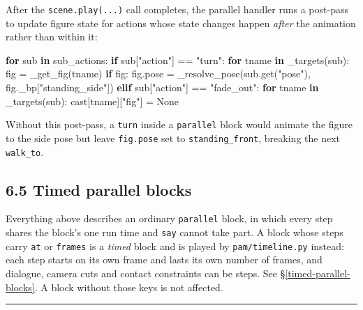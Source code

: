 \documentclass[
  12pt,
  letterpaper,
]{book}
\newenvironment{Shaded}{}{}
\newcommand{\ControlFlowTok}[1]{\textcolor[rgb]{0.00,0.44,0.13}{\textbf{#1}}}
\newcommand{\KeywordTok}[1]{\textcolor[rgb]{0.00,0.44,0.13}{\textbf{#1}}}
\newcommand{\NormalTok}[1]{#1}
\newcommand{\OperatorTok}[1]{\textcolor[rgb]{0.40,0.40,0.40}{#1}}
\newcommand{\StringTok}[1]{\textcolor[rgb]{0.25,0.44,0.63}{#1}}
\newcommand{\VariableTok}[1]{\textcolor[rgb]{0.10,0.09,0.49}{#1}}
\begin{document}
After the \texttt{scene.play(...)} call completes, the parallel handler
runs a post-pass to update figure state for actions whose state changes
happen \emph{after} the animation rather than within it:

\begin{Shaded}
\begin{Highlighting}[]
\ControlFlowTok{for}\NormalTok{ sub }\KeywordTok{in}\NormalTok{ sub\_actions:}
    \ControlFlowTok{if}\NormalTok{ sub[}\StringTok{"action"}\NormalTok{] }\OperatorTok{==} \StringTok{"turn"}\NormalTok{:}
        \ControlFlowTok{for}\NormalTok{ tname }\KeywordTok{in}\NormalTok{ \_targets(sub):}
\NormalTok{            fig }\OperatorTok{=}\NormalTok{ \_get\_fig(tname)}
            \ControlFlowTok{if}\NormalTok{ fig:}
\NormalTok{                fig.pose }\OperatorTok{=}\NormalTok{ \_resolve\_pose(sub.get(}\StringTok{"pose"}\NormalTok{),}
\NormalTok{                                         fig.\_bp[}\StringTok{"standing\_side"}\NormalTok{])}
    \ControlFlowTok{elif}\NormalTok{ sub[}\StringTok{"action"}\NormalTok{] }\OperatorTok{==} \StringTok{"fade\_out"}\NormalTok{:}
        \ControlFlowTok{for}\NormalTok{ tname }\KeywordTok{in}\NormalTok{ \_targets(sub):}
\NormalTok{            cast[tname][}\StringTok{"fig"}\NormalTok{] }\OperatorTok{=} \VariableTok{None}
\end{Highlighting}
\end{Shaded}

Without this post-pass, a \texttt{turn} inside a \texttt{parallel} block
would animate the figure to the side pose but leave \texttt{fig.pose}
set to \texttt{standing\_front}, breaking the next \texttt{walk\_to}.

\subsection{6.5 Timed parallel blocks}\label{timed-parallel-blocks-pointer}

Everything above describes an ordinary \texttt{parallel} block, in
which every step shares the block's one run time and \texttt{say}
cannot take part. A block whose steps carry \texttt{at} or
\texttt{frames} is a \emph{timed} block and is played by
\texttt{pam/timeline.py} instead: each step starts on its own frame and
lasts its own number of frames, and dialogue, camera cuts and contact
constraints can be steps. See \S\ref{timed-parallel-blocks}. A block
without those keys is not affected.

\begin{center}\rule{0.5\linewidth}{0.5pt}\end{center}
\end{document}
